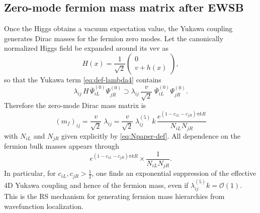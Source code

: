 \documentclass[11pt]{article}
\begin{document}
\subsection{Zero-mode fermion mass matrix after EWSB}
Once the Higgs obtains a vacuum expectation value, the Yukawa coupling generates Dirac masses
for the fermion zero modes. Let the canonically normalized Higgs field be expanded around its vev as
\begin{equation}
H(x) = \frac{1}{\sqrt{2}}
\begin{pmatrix}
0\\ v + h(x)
\end{pmatrix},
\label{eq:H-vev}
\end{equation}
so that the Yukawa term \eqref{eq:def-lambda4} contains
\[
\lambda_{ij}\,H\,\overline{\Psi}^{(0)}_{iL}\Psi^{(0)}_{jR}
\supset
\lambda_{ij}\,\frac{v}{\sqrt{2}}\;\overline{\Psi}^{(0)}_{iL}\Psi^{(0)}_{jR}.
\]
Therefore the zero-mode Dirac mass matrix is
\begin{equation}
\boxed{
(m_f)_{ij} = \frac{v}{\sqrt{2}}\;\lambda_{ij}
=
\frac{v}{\sqrt{2}}\;
\lambda^{(5)}_{ij}\,k\,
\frac{e^{(1-c_{iL}-c_{jR})\pi kR}}{N_{iL}N_{jR}}
}
\label{eq:mf-zero}
\end{equation}
with $N_{iL}$ and $N_{jR}$ given explicitly by \eqref{eq:Npaper-def}. All dependence on the fermion bulk masses appears through
\[
e^{(1-c_{iL}-c_{jR})\pi kR}\times \frac{1}{N_{iL}N_{jR}}.
\]
In particular, for $c_{iL},c_{jR}>\tfrac12$, one finds an exponential suppression of the effective
4D Yukawa coupling and hence of the fermion mass, even if $\lambda^{(5)}_{ij}k=\mathcal{O}(1)$.
This is the RS mechanism for generating fermion mass hierarchies from wavefunction localization.
\end{document}
